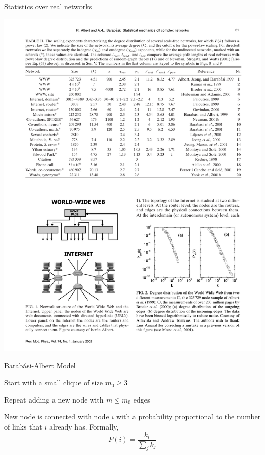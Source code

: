 \begin{frame}{Statistics over real networks}
	
\includegraphics[width=\textwidth]{figs/08/statistics2}

\end{frame}

\begin{frame}{Barab\'{a}si-Albert Model}

\begin{definition}
\BI
\item Start with a small clique of size $m_0 \geq 3$
\item Repeat adding a new node with $m \leq m_0$ edges
\item New node is connected with node $i$ with a probability proportional to the
number of links that $i$ already has. Formally,
\[
  P(i) = \frac{k_i}{\sum_j k_j}
\]
\EI
\end{definition}

\end{frame}

